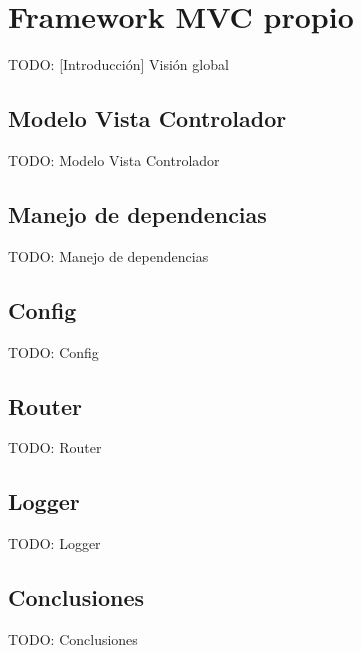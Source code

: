 \chapter{Framework MVC propio\label{extra:framework_mvc_propio}}

TODO: [Introducción]
  {Visión global}


\section{Modelo Vista Controlador\label{extra:sec:mvc}}

TODO: Modelo Vista Controlador


\section{Manejo de dependencias\label{extra:sec:dependencias}}

TODO: Manejo de dependencias


\section{Config\label{extra:sec:config}}

TODO: Config


\section{Router\label{extra:sec:router}}

TODO: Router


\section{Logger\label{extra:sec:logger}}

TODO: Logger


\section{Conclusiones\label{extra:sec:conclusiones}}

TODO: Conclusiones